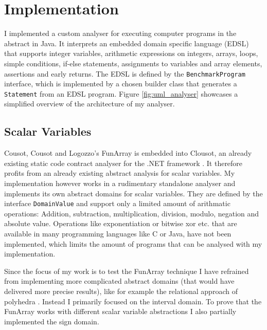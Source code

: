 \chapter{Implementation}

I implemented a custom analyser for executing computer programs in the abstract in Java. It interprets an embedded domain specific language (EDSL) that supports integer variables, arithmetic expressions on integers, arrays, loops, simple conditions, if-else statements, assignments to variables and array elements, assertions and early returns. The EDSL is defined by the \texttt{BenchmarkProgram} interface, which is implemented by a chosen builder class that generates a \texttt{Statement} from an EDSL program. Figure \ref{fig:uml_analyser} showcases a simplified overview of the architecture of my analyser.



\section{Scalar Variables}\label{sec:scalarvariables}
Cousot, Cousot and Logozzo's FunArray is embedded into Clousot, an already existing static code contract analyser for the .NET framework \cite{cousot2011}. It therefore profits from an already existing abstract analysis for scalar variables. My implementation however works in a rudimentary standalone analyser and implements its own abstract domains for scalar variables.
They are defined by the interface \texttt{DomainValue} and support only a limited amount of arithmatic operations: Addition, subtraction, multiplication, division, modulo, negation and absolute value. Operations like exponentiation or bitwise xor etc. that are available in many programming languages like C or Java, have not been implemented, which limits the amount of programs that can be analysed with my implementation. 

Since the focus of my work is to test the FunArray technique I have refrained from implementing more complicated abstract domains (that would have delivered more precise results), like for example the relational approach of polyhedra \cite{cousot1978}. Instead I primarily focused on the interval domain. To prove that the FunArray works with different scalar variable abstractions I also partially implemented the sign domain.

